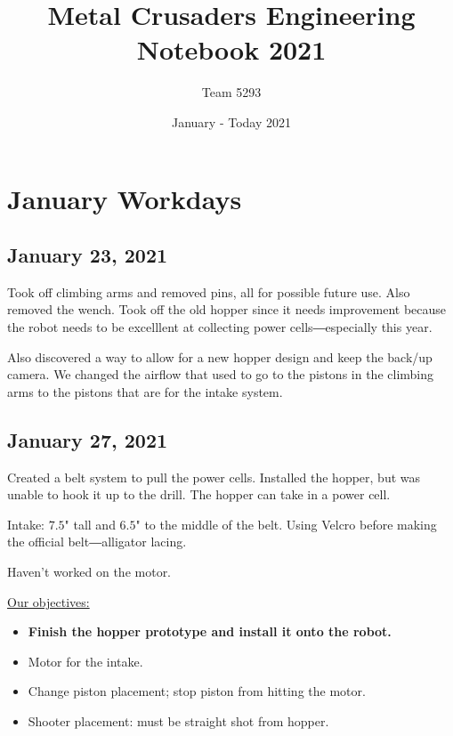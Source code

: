 \documentclass{article}
\title{\textbf{Metal Crusaders Engineering Notebook 2021}}
\author{Team 5293}
\date{January - Today 2021}
\begin{document}

\maketitle
\newpage

\tableofcontents
\newpage

\section{January Workdays}

\subsection{January 23, 2021}

Took off climbing arms and removed pins, all for possible future use. Also removed the wench.
Took off the old hopper since it needs improvement because the robot needs to be excelllent at collecting power cells―especially this year.

Also discovered a way to allow for a new hopper design and keep the back\-/up camera. We changed the airflow that used to go to the pistons in the climbing arms to the pistons that are for the intake system.

\subsection{January 27, 2021}

Created a belt system to pull the power cells. Installed the hopper, but was unable to hook it up to the drill. The hopper can take in a power cell.

Intake: $7.5$" tall and $6.5$" to the middle of the belt. Using Velcro before making the official belt―alligator lacing.

Haven't worked on the motor.

\begin{flushleft}
  \underline{Our objectives:}
\end{flushleft}
\begin{itemize}
  \item \textbf{Finish the hopper prototype and install it onto the robot.}
  \item Motor for the intake.
  \item Change piston placement; stop piston from  hitting the motor.
  \item Shooter placement: must be straight shot from hopper.
\end{itemize}
\end{document}
